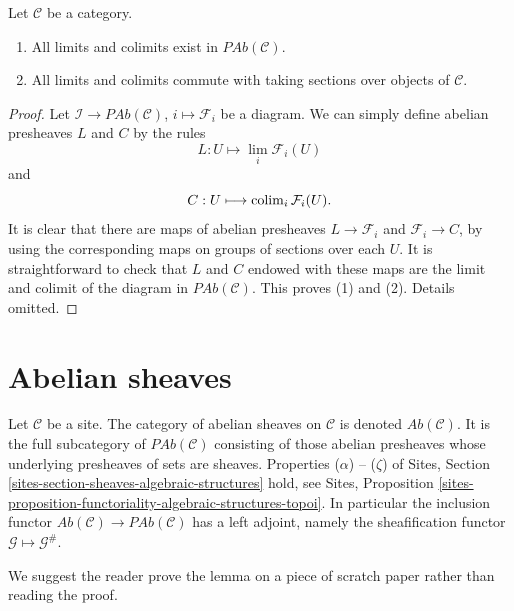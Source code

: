 \begin{lemma}
\label{lemma-limits-colimits-abelian-presheaves}
Let $\mathcal{C}$ be a category.
\begin{enumerate}
\item All limits and colimits exist in $\textit{PAb}(\mathcal{C})$.
\item All limits and colimits commute with taking sections over objects of
$\mathcal{C}$.
\end{enumerate}
\end{lemma}

\begin{proof}
Let $\mathcal{I} \to \textit{PAb}(\mathcal{C})$, $i \mapsto \mathcal{F}_i$
be a diagram. We can simply define abelian presheaves
$L$ and $C$ by the rules
$$
L : U \longmapsto \lim_i \mathcal{F}_i(U)
$$
and
$$
C : U \longmapsto \mathop{\mathrm{colim}}\nolimits_i \mathcal{F}_i(U).
$$
It is clear that there are maps of abelian presheaves $L \to \mathcal{F}_i$
and $\mathcal{F}_i \to C$, by using the corresponding maps on groups of
sections over each $U$. It is straightforward to check that $L$ and $C$ endowed
with these maps are the limit and colimit of the diagram in
$\textit{PAb}(\mathcal{C})$. This proves (1) and (2). Details omitted.
\end{proof}


\section{Abelian sheaves}
\label{section-abelian-sheaves}

\noindent
Let $\mathcal{C}$ be a site.
The category of abelian sheaves on $\mathcal{C}$ is denoted
$\textit{Ab}(\mathcal{C})$. It is the full subcategory of
$\textit{PAb}(\mathcal{C})$ consisting of those abelian presheaves
whose underlying presheaves of sets are sheaves.
Properties ($\alpha$) -- ($\zeta$) of
Sites, Section \ref{sites-section-sheaves-algebraic-structures}
hold, see
Sites,
Proposition \ref{sites-proposition-functoriality-algebraic-structures-topoi}.
In particular the inclusion functor
$\textit{Ab}(\mathcal{C}) \to \textit{PAb}(\mathcal{C})$
has a left adjoint, namely the sheafification functor
$\mathcal{G} \mapsto \mathcal{G}^\#$.

\medskip\noindent
We suggest the reader prove the lemma on a piece of scratch paper rather
than reading the proof.

